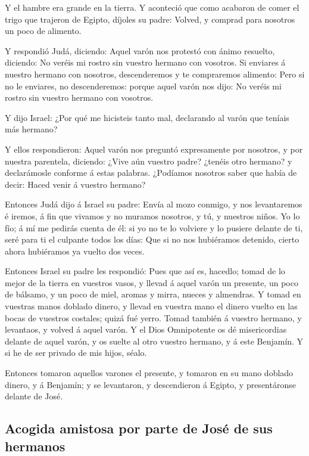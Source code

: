  Y el hambre era grande en la tierra.  Y
aconteció que como acabaron de comer el trigo que trajeron de Egipto,
díjoles su padre: Volved, y comprad para nosotros un poco de alimento.

 Y respondió Judá, diciendo: Aquel varón nos protestó con
ánimo resuelto, diciendo: No veréis mi rostro sin vuestro hermano con
vosotros.  Si enviares á nuestro hermano con nosotros,
descenderemos y te compraremos alimento:  Pero si no le
enviares, no descenderemos: porque aquel varón nos dijo: No veréis mi
rostro sin vuestro hermano con vosotros.

 Y dijo Israel: ¿Por qué me hicisteis tanto mal,
declarando al varón que teníais más hermano?

 Y ellos respondieron: Aquel varón nos preguntó
expresamente por nosotros, y por nuestra parentela, diciendo: ¿Vive aún
vuestro padre? ¿tenéis otro hermano? y declarámosle conforme á estas
palabras. ¿Podíamos nosotros saber que había de decir: Haced venir á
vuestro hermano?

 Entonces Judá dijo á Israel su padre: Envía al mozo
conmigo, y nos levantaremos é iremos, á fin que vivamos y no muramos
nosotros, y tú, y nuestros niños.  Yo lo fío; á mí me
pedirás cuenta de él: si yo no te lo volviere y lo pusiere delante de
ti, seré para ti el culpante todos los días:  Que si no
nos hubiéramos detenido, cierto ahora hubiéramos ya vuelto dos veces.

 Entonces Israel su padre les respondió: Pues que así es,
hacedlo; tomad de lo mejor de la tierra en vuestros vasos, y llevad á
aquel varón un presente, un poco de bálsamo, y un poco de miel, aromas y
mirra, nueces y almendras.  Y tomad en vuestras manos
doblado dinero, y llevad en vuestra mano el dinero vuelto en las bocas
de vuestros costales; quizá fué yerro.  Tomad también á
vuestro hermano, y levantaos, y volved á aquel varón.  Y
el Dios Omnipotente os dé misericordias delante de aquel varón, y os
suelte al otro vuestro hermano, y á este Benjamín. Y si he de ser
privado de mis hijos, séalo.

 Entonces tomaron aquellos varones el presente, y tomaron
en su mano doblado dinero, y á Benjamín; y se levantaron, y descendieron
á Egipto, y presentáronse delante de José.

\hypertarget{acogida-amistosa-por-parte-de-josuxe9-de-sus-hermanos}{%
\subsection{Acogida amistosa por parte de José de sus
hermanos}\label{acogida-amistosa-por-parte-de-josuxe9-de-sus-hermanos}}


